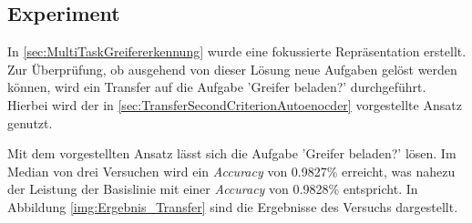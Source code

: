 	\subsection{Experiment}
	\label{subsec:TransferLogs}
	In \ref{sec:MultiTaskGreifererkennung} wurde eine fokussierte Repräsentation erstellt. Zur Überprüfung, ob ausgehend von dieser Lösung neue Aufgaben gelöst werden können, wird ein Transfer auf die Aufgabe 'Greifer beladen?' durchgeführt. Hierbei wird der in \ref{sec:TransferSecondCriterionAutoenocder} vorgestellte Ansatz genutzt.  
	
	Mit dem vorgestellten Ansatz lässt sich die Aufgabe 'Greifer beladen?' lösen. Im Median von drei Versuchen wird ein \textit{Accuracy} von 0.9827\% erreicht, was nahezu der Leistung der Basislinie mit einer \textit{Accuracy} von 0.9828\% entspricht. In Abbildung \ref{img:Ergebnis_Transfer} sind die Ergebnisse des Versuchs dargestellt.
	
